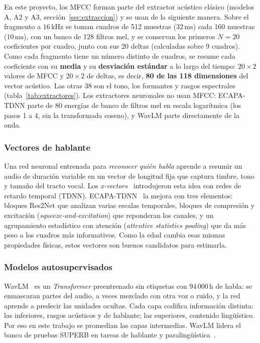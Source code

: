 \documentclass[11pt,a4paper]{article}
\begin{document}
En este proyecto, los MFCC forman parte del extractor acústico clásico (modelos A, A2 y A3, sección~\ref{sec:extraccion}) y se usan de la siguiente manera. Sobre el fragmento a $16\,\mathrm{kHz}$ se toman cuadros de 512 muestras ($32\,\mathrm{ms}$) cada 160 muestras ($10\,\mathrm{ms}$), con un banco de 128 filtros mel, y se conservan los primeros $N = 20$ coeficientes por cuadro, junto con sus 20 deltas (calculadas sobre 9 cuadros). Como cada fragmento tiene un número distinto de cuadros, se resume cada coeficiente con su \textbf{media} y su \textbf{desviación estándar} a lo largo del tiempo: $20 \times 2$ valores de MFCC y $20 \times 2$ de deltas, es decir, \textbf{80 de las 118 dimensiones} del vector acústico. Las otras 38 son el tono, los formantes y rasgos espectrales (tabla~\ref{tab:extractores}). Los extractores neuronales no usan MFCC: ECAPA-TDNN parte de 80 energías de banco de filtros mel en escala logarítmica (los pasos 1 a 4, sin la transformada coseno), y WavLM parte directamente de la onda.

\subsubsection{Vectores de hablante}

Una red neuronal entrenada para \emph{reconocer quién habla} aprende a resumir un audio de duración variable en un vector de longitud fija que captura timbre, tono y tamaño del tracto vocal. Los \emph{x-vectors}~\cite{xvector2018} introdujeron esta idea con redes de retardo temporal (TDNN). ECAPA-TDNN~\cite{ecapa2020} la mejora con tres elementos: bloques Res2Net que analizan varias escalas temporales, bloques de compresión y excitación (\emph{squeeze-and-excitation}) que reponderan los canales, y un agrupamiento estadístico con atención (\emph{attentive statistics pooling}) que da más peso a los cuadros más informativos. Como la edad cambia esas mismas propiedades físicas, estos vectores son buenos candidatos para estimarla.

\subsubsection{Modelos autosupervisados}

WavLM~\cite{wavlm2022} es un \emph{Transformer} preentrenado sin etiquetas con $94\,000\,\mathrm{h}$ de habla: se enmascaran partes del audio, a veces mezclado con otra voz o ruido, y la red aprende a predecir las unidades ocultas. Cada capa codifica información distinta: las inferiores, rasgos acústicos y de hablante; las superiores, contenido lingüístico. Por eso en este trabajo se promedian las capas intermedias. WavLM lidera el banco de pruebas SUPERB en tareas de hablante y paralingüística~\cite{superb2021}.
\end{document}
